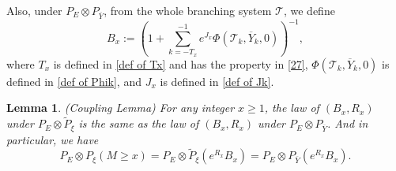 \documentclass[]{article}
\numberwithin{equation}{section}
\theoremstyle{thmstyleone}%
\theoremstyle{thmstyletwo}%
\theoremstyle{thmstylethree}%
\theoremstyle{thmstylefour}%
\newtheorem{lemma}{Lemma}
\theoremstyle{thmstylefive}%
\theoremstyle{thmstylesix}%
\begin{document}
	Also, under $P_E\otimes P_{\overline{Y}}$, from the whole branching system $\mathcal{T}$, we define
	\begin{equation}\label{def of overlineA}
		B_x:= \left(1+\sum_{k=-T_x}^{-1}e^{J_x}\Phi(\mathcal{T}_k,\overline{Y}_k,0)\right)^{-1},
	\end{equation}
	where $T_x$ is defined in \cref{def of Tx} and has the property in \cref{27}, $\Phi(\mathcal{T}_k,\overline{Y}_k,0)$ is defined in \cref{def of Phik}, and $J_x$ is defined in \cref{def of Jk}.
	
	\begin{lemma}\label{Couping Lemma}(Coupling Lemma)
		For any integer $x\geqslant 1$,
		the law of $(B_x,R_x)$ under $P_E\otimes \tilde{P}_\xi$ is the same as the law of $(B_x,R_x)$ under $P_E\otimes P_{\overline{Y}}$.
		And in particular, we have
		\begin{equation}
			P_E\otimes P_{\xi}(M\geqslant x) = 
			P_E\otimes \tilde{P}_{\xi} (e^{R_x}B_x)
			=
			P_E\otimes P_{\overline{Y}}\left( e^{R_x} B_x \right).
		\end{equation}
	\end{lemma}
	
\end{document}
